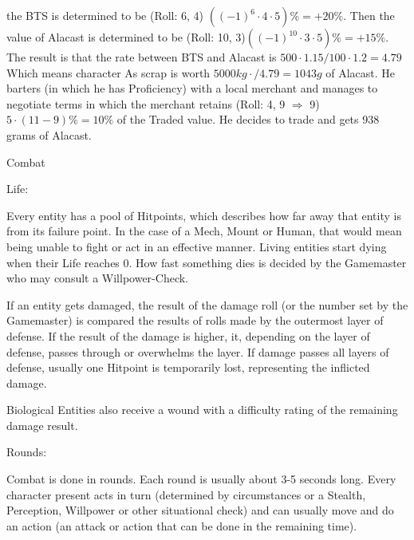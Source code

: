 \documentclass{article}
\newcommand{\subhline}[1]{\begin{center}\large #1 \normalsize \end{center}}
\begin{document}
    the BTS is determined to be (Roll: 6, 4) \(((-1)^{6}\cdot4\cdot5) \% = +20\%\). Then the value of Alacast is determined
    to be (Roll: 10, 3)\(((-1)^{10}\cdot3\cdot5) \% = +15\%\). The result is that the rate between BTS and Alacast is
    \( 500\cdot1.15/100\cdot1.2 = 4.79\) \\ Which means character As scrap is worth
    \(5000 kg\cdot / 4.79 = 1043 g \) of Alacast. He barters (in which he has Proficiency) with a local merchant and manages to
    negotiate terms in which the merchant retains (Roll: 4, 9 \(\Rightarrow\) 9) \(5\cdot(11-9)\% = 10\%\) of the Traded
    value. He decides to trade and gets 938 grams of Alacast.\newline\newline
    \pagebreak[1]
    \subhline{Combat}

    Life:\par
    Every entity has a pool of Hitpoints, which describes how far away that entity is from its failure point.
    In the case of a Mech, Mount or Human, that would mean being unable to fight or act in an effective manner. Living
    entities start dying when their Life reaches 0. How fast something dies is decided by the Gamemaster who may consult a
    Willpower-Check.\par
    If an entity gets damaged, the result of the damage roll (or the number set by the Gamemaster) is compared the results
    of rolls made by the outermost layer of defense. If the result of the damage is higher, it, depending on the
    layer of defense, passes through or overwhelms the layer. If damage passes all layers of defense, usually one Hitpoint
    is temporarily lost, representing the inflicted damage. \par
    Biological Entities also receive a wound with a difficulty rating of the remaining damage result.\newline\newline

    Rounds:\par
    Combat is done in rounds. Each round is usually about 3-5 seconds long. Every character present acts in turn (determined
    by circumstances or a Stealth, Perception, Willpower or other situational check) and can usually move and do an action
    (an attack or action that can be done in the remaining time).\newline\newline
\end{document}
